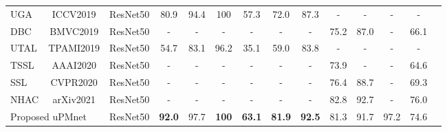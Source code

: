 \documentclass{cta-author}
\begin{document}
\begin{table*}[!ht]
\begin{threeparttable}
\begin{tabular}{lccccccccccccc}
				UGA \cite{RN370}                                                    & ICCV2019                   & ResNet50                   & 80.9                   & 94.4                   & 100                    & 57.3                            & 72.0                   & 87.3                   & -                      & -                      & -                   & -                       \\
				DBC \cite{RN118}                                  & BMVC2019  & ResNet50 & -    & -    & -    & -             & -    & -    & 75.2 & 87.0 & - & 66.1  \\ 
				
				UTAL \cite{RN97}                                                    & TPAMI2019                  & ResNet50                   & 54.7                   & 83.1                   & 96.2                   & 35.1                            & 59.0                   & 83.8                   & -                      & -                      & -                   & -                       \\
				TSSL \cite{RN389}                                                   & AAAI2020                   & ResNet50                   & -                      & -                      & -                      & -                               & -                      & -                      & 73.9                   & -                      & -                   & 64.6                    \\
				SSL \cite{RN492}                                                    & CVPR2020                   & ResNet50                   & -                      & -                      & -                      & -                               & -                      & -                      & 76.4                   & 88.7                   & -                   & 69.3                    \\   
				NHAC \cite{RN536}                                 & arXiv2021 & ResNet50 & -    & -    & -    & -             & -    & -    & 82.8 & 92.7 & - & 76.0  \\ \hline
				\multicolumn{2}{l}{Proposed uPMnet}                                                              & ResNet50                   & \textbf{92.0}          & 97.7                   & \textbf{100}           & \textbf{63.1}                   & \textbf{81.9}          & \textbf{92.5}          & 81.3                   & 91.7                   & 97.2                & 74.6                    \\

\end{tabular}
\end{threeparttable}
\end{table*}
\end{document}
